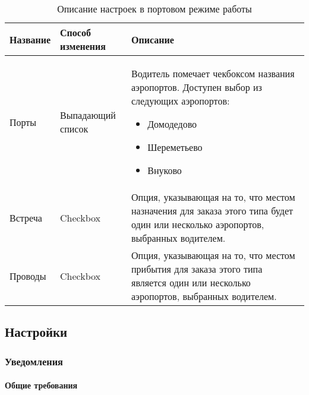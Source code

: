       \begin{table}
          \begin{center}
          \caption {Описание настроек в портовом режиме работы}
          \label{table:driver_app_robot_tab_table_port_mode}
          \setlength{\extrarowheight}{2mm}
          \begin{tabular}{|p{4cm}|p{3cm}|p{8cm}|}

            \hline     \textbf{Название}&\textbf{Способ изменения}&\textbf{Описание} \\ [2mm]

            \hline   Порты & Выпадающий список & Водитель помечает чекбоксом названия аэропортов. Доступен выбор из следующих аэропортов: \begin{itemize} \item Домодедово \item Шереметьево \item Внуково \end{itemize} \\ [2mm]

            \hline   Встреча & Checkbox & Опция, указывающая на то, что местом назначения для заказа этого типа будет один или несколько аэропортов, выбранных водителем. \\ [2mm]

            \hline   Проводы & Checkbox & Опция, указывающая на то, что местом прибытия для заказа этого типа является один или несколько аэропортов, выбранных водителем. \\ [2mm]

            \hline
          \end{tabular}
          \end{center}
      \end{table}

  \subsection{Настройки} \label{driver_app_settings_tab}

    \subsubsection{Уведомления}

      \paragraph{Общие требования} \mbox{}\\

